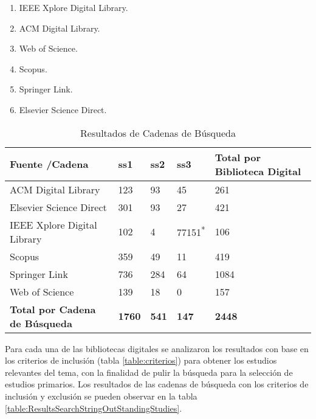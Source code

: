 \documentclass[•]{article}
\begin{document}
    \begin{enumerate}
        \label{orderLibraries}
            \item IEEE Xplore Digital Library.
            \item ACM Digital Library.
            \item Web of Science.
            \item Scopus.
            \item Springer Link.
            \item Elsevier Science Direct.
    \end{enumerate}    

    \begin{table}
    \begin{center}
        \caption{Resultados de Cadenas de Búsqueda}
        \label{table:ResultsSearchString}
        \begin{tabular}{| p{2.5cm} | p{.6cm} | p{.6cm} | p{.8cm} | p{1.5cm} |}
            \toprule
            \hline
            \textbf{Fuente /Cadena} & \textbf{ss1} & \textbf{ss2} & \textbf{ss3} & \textbf{Total por Biblioteca Digital}\\ \hline
            ACM Digital Library & 123 & 93 & 45 & 261\\ \hline
            Elsevier Science Direct & 301 & 93 & 27 & 421\\ \hline
            IEEE Xplore Digital Library & 102 & 4 & 77151\textsuperscript{*} & 106\\ \hline
            Scopus & 359 & 49 & 11 & 419\\ \hline
            Springer Link & 736 & 284 & 64 &  1084\\ \hline
            Web of Science & 139 & 18 & 0 & 157\\ \hline
            \textbf{Total por Cadena de Búsqueda} & \textbf{1760} & \textbf{541} & \textbf{147} & \textbf{2448}\\ \hline
        \end{tabular}
    \end{center}
    \end{table}
    Para cada una de las bibliotecas digitales se analizaron los resultados con base en los criterios de inclusión (tabla \ref{table:criterios}) para obtener los estudios relevantes del tema, con la finalidad de pulir la búsqueda para la selección de estudios primarios. Los resultados de las cadenas de búsqueda con los criterios de inclusión y exclusión se pueden observar en la tabla \ref{table:ResultsSearchStringOutStandingStudies}.
\end{document}
